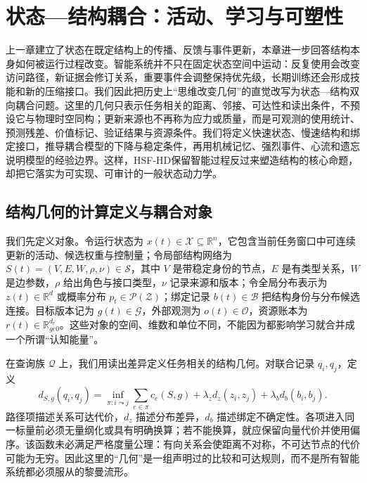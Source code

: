 \chapter{状态—结构耦合：活动、学习与可塑性}
\label{chp:geometry_physics_interaction}

上一章建立了状态在既定结构上的传播、反馈与事件更新，本章进一步回答结构本身如何被运行过程改变。智能系统并不只在固定状态空间中运动：反复使用会改变访问路径，新证据会修订关系，重要事件会调整保持优先级，长期训练还会形成技能和新的压缩接口。我们因此把历史上“思维改变几何”的直觉改写为状态—结构双向耦合问题。这里的几何只表示任务相关的距离、邻接、可达性和读出条件，不预设它与物理时空同构；更新来源也不再称为应力或质量，而是可观测的使用统计、预测残差、价值标记、验证结果与资源条件。我们将定义快速状态、慢速结构和绑定接口，推导耦合模型的下降与稳定条件，再用机械记忆、强烈事件、心流和遗忘说明模型的经验边界。这样，HSF-HD保留智能过程反过来塑造结构的核心命题，却把它落实为可实现、可审计的一般状态动力学。

\section{结构几何的计算定义与耦合对象}
\label{sec:section_7455}

我们先定义对象。令运行状态为 $x(t)\in\mathcal X\subseteq\mathbb R^n$，它包含当前任务窗口中可连续更新的活动、候选权重与控制量；令局部结构网络为 $S(t)=(V,E,W,\rho,\nu)\in\mathcal S$，其中 $V$ 是带稳定身份的节点，$E$ 是有类型关系，$W$ 是边参数，$\rho$ 给出角色与接口类型，$\nu$ 记录来源和版本；令全局分布表示为 $z(t)\in\mathbb R^d$ 或概率分布 $p_t\in\mathcal P(\mathcal Z)$；绑定记录 $b(t)\in\mathcal B$ 把结构身份与分布候选连接。目标版本记为 $g(t)\in\mathcal G$，外部观测为 $o(t)\in\mathcal O$，资源账本为 $r(t)\in\mathbb R_{ge0}^{d_r}$。这些对象的空间、维数和单位不同，不能因为都影响学习就合并成一个所谓“认知能量”。

在查询族 $\mathcal Q$ 上，我们用读出差异定义任务相关的结构几何。对联合记录 $q_i,q_j$，定义
\begin{equation}
 d_{S,g}(q_i,q_j)=\inf_{\pi:i\leadsto j}\sum_{e\in\pi}c_e(S,g)
 +\lambda_z d_z(z_i,z_j)+\lambda_b d_b(b_i,b_j).
 \label{eq:structure_task_metric}
\end{equation}
路径项描述关系可达代价，$d_z$ 描述分布差异，$d_b$ 描述绑定不确定性。各项进入同一标量前必须无量纲化或具有明确换算；若不能换算，就应保留向量代价并使用偏序。该函数未必满足严格度量公理：有向关系会使距离不对称，不可达节点的代价可能为无穷。因此这里的“几何”是一组声明过的比较和可达规则，而不是所有智能系统都必须服从的黎曼流形。

